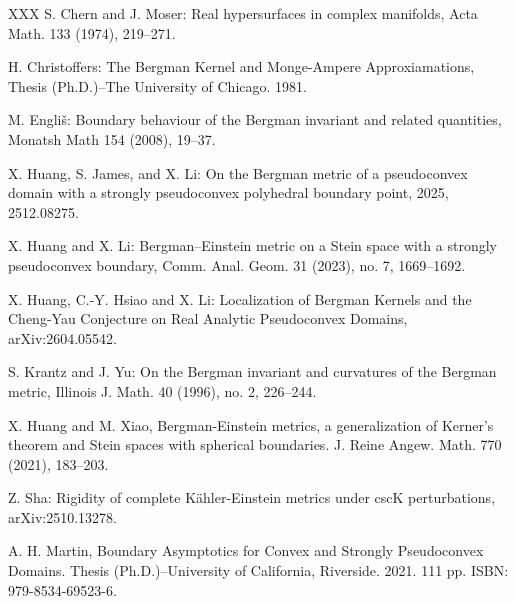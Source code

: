 \documentclass[a4paper,centertags,osxzneside,12pt]{amsart}
\numberwithin{equation}{section}
\begin{document}
\begin{thebibliography}{XXX}
\setlength{\parskip}{0pt}
 S. Chern and J. Moser: Real hypersurfaces in complex manifolds, Acta Math. 133 (1974), 219--271.

 H. Christoffers:
The Bergman Kernel and Monge-Ampere  Approxiamations, Thesis
(Ph.D.)--The University of Chicago. 1981.


 M. Engliš: Boundary behaviour of the Bergman invariant and related quantities, Monatsh Math 154 (2008), 19--37.

 X. Huang, S. James, and X. Li: On the Bergman metric of a pseudoconvex domain with a strongly
pseudoconvex polyhedral boundary point, 2025, 2512.08275. 




 X. Huang and X. Li: Bergman–Einstein metric on a Stein space with a strongly pseudoconvex boundary, Comm. Anal. Geom. 31 (2023), no. 7, 1669--1692.

 X. Huang, C.-Y. Hsiao and X. Li: Localization of Bergman Kernels and the Cheng-Yau Conjecture on Real Analytic Pseudoconvex Domains, arXiv:2604.05542.

 S. Krantz and J. Yu: On the Bergman invariant and curvatures of the Bergman metric, Illinois J. Math. 40 (1996), no. 2, 226--244.

 X. Huang and M. Xiao,  Bergman-Einstein metrics, a generalization of Kerner's theorem and Stein spaces with spherical boundaries. J. Reine Angew. Math. 770 (2021), 183–203.

 Z. Sha: Rigidity of complete K\"ahler-Einstein metrics under cscK perturbations, arXiv:2510.13278.

A. H. Martin, Boundary Asymptotics for Convex and Strongly Pseudoconvex Domains. Thesis (Ph.D.)–University of California, Riverside. 2021. 111 pp. ISBN: 979-8534-69523-6.
\end{thebibliography}
\end{document}
